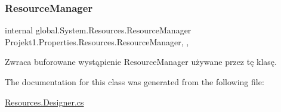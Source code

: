 \mbox{\label{class_projekt1_1_1_properties_1_1_resources_a18fe528e3b790c571d6a238300f91c02}} 
\subsubsection{\texorpdfstring{ResourceManager}{ResourceManager}}
{\footnotesize\ttfamily internal global.\+System.\+Resources.\+Resource\+Manager Projekt1.\+Properties.\+Resources.\+Resource\+Manager\hspace{0.3cm}{\ttfamily [static]}, {\ttfamily [get]}, {\ttfamily [private]}}



Zwraca buforowane wystąpienie Resource\+Manager używane przez tę klasę. 



The documentation for this class was generated from the following file\+:\begin{DoxyCompactItemize}
\item 
\mbox{\hyperlink{_resources_8_designer_8cs}{Resources.\+Designer.\+cs}}\end{DoxyCompactItemize}
